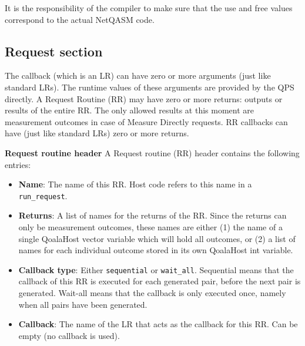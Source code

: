 It is the responsibility of the compiler to make sure that the use and free values correspond to the actual NetQASM code.


\subsection{Request section}
The callback (which is an LR) can have zero or more arguments (just like standard LRs). The runtime values of these arguments are provided by the QPS directly.
A Request Routine (RR) may have zero or more returns: outputs or results of the entire RR. The only allowed results at this moment are measurement outcomes in case of Measure Directly requests.
RR callbacks can have (just like standard LRs) zero or more returns.


\textbf{Request routine header}
A Request routine (RR) header contains the following entries:
\begin{itemize}
\item \textbf{Name}: The name of this RR. Host code refers to this name in a \texttt{run\_request}.
\item \textbf{Returns}: A list of names for the returns of the RR. Since the returns can only be measurement outcomes, these names are either (1) the name of a single QoalaHost vector variable which will hold all outcomes, or (2) a list of names for each individual outcome stored in its own QoalaHost int variable.
\item \textbf{Callback type}: Either \texttt{sequential} or \texttt{wait\_all}. Sequential means that the callback of this RR is executed for each generated pair, before the next pair is generated. Wait-all means that the callback is only executed once, namely when all pairs have been generated.
\item \textbf{Callback}: The name of the LR that acts as the callback for this RR. Can be empty (no callback is used).
\end{itemize}


